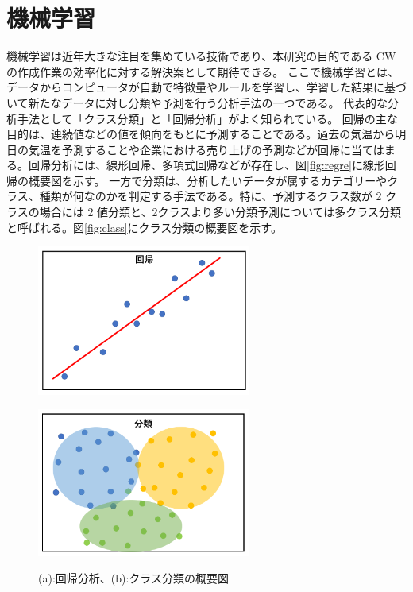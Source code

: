 \section{機械学習}
機械学習は近年大きな注目を集めている技術であり、本研究の目的である CW　の作成作業の効率化に対する解決案として期待できる。
ここで機械学習とは、データからコンピュータが自動で特徴量やルールを学習し、学習した結果に基づいて新たなデータに対し分類や予測を行う分析手法の一つである。
代表的な分析手法として「クラス分類」と「回帰分析」がよく知られている。
回帰の主な目的は、連続値などの値を傾向をもとに予測することである。過去の気温から明日の気温を予測することや企業における売り上げの予測などが回帰に当てはまる。回帰分析には、線形回帰、多項式回帰などが存在し、図\ref{fig:regre}に線形回帰の概要図を示す。
一方で分類は、分析したいデータが属するカテゴリーやクラス、種類が何なのかを判定する手法である。特に、予測するクラス数が 2 クラスの場合には 2 値分類と、2クラスより多い分類予測については多クラス分類と呼ばれる。図\ref{fig:class}にクラス分類の概要図を示す。
\begin{figure}[tb]
  \centering
    \begin{minipage}[b]{0.4\linewidth}
        \centering
        \includegraphics[clip, width=7cm]{fig/4/regression.png}
        \vspace{10pt}
        \subcaption{}
        \label{fig:regre}
    \end{minipage}
    \hfill
    \begin{minipage}[b]{0.4\linewidth}
        \centering
        \includegraphics[clip, width=7cm]{fig/4/classification.png}
        \vspace{10pt}
        \subcaption{}
        \label{fig:class}
    \end{minipage}
  \caption{(a):回帰分析、(b):クラス分類の概要図}
  \label{fig:fit_def}
\end{figure}


